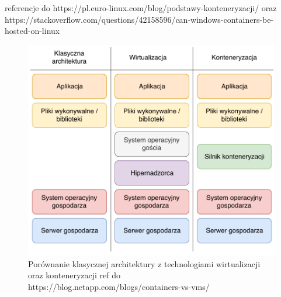 referencje do https://pl.euro-linux.com/blog/podstawy-konteneryzacji/ oraz https://stackoverflow.com/questions/42158596/can-windows-containers-be-hosted-on-linux



\begin{figure} [H]
\centering
\caption{Porównanie klasycznej architektury z technologiami wirtualizacji oraz konteneryzacji ref do https://blog.netapp.com/blogs/containers-vs-vms/}
\includegraphics[width=\textwidth]{res/virtualizationAndContenerizatrionComparison}
\end{figure}